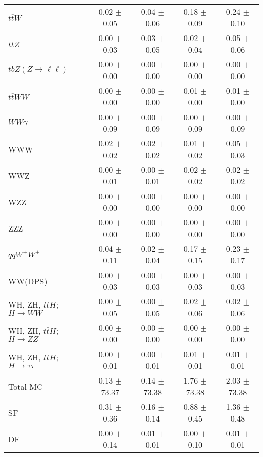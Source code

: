 \begin{tabular}{l|cccc}
                   $t\overline{t}W$ &  0.02 $\pm$  0.05 &  0.04 $\pm$  0.06 &  0.18 $\pm$  0.09 &  0.24 $\pm$  0.10 \\
                   $t\overline{t}Z$ &  0.00 $\pm$  0.03 &  0.03 $\pm$  0.05 &  0.02 $\pm$  0.04 &  0.05 $\pm$  0.06 \\
    $tbZ (Z \rightarrow \ell \ell)$ &  0.00 $\pm$  0.00 &  0.00 $\pm$  0.00 &  0.00 $\pm$  0.00 &  0.00 $\pm$  0.00 \\
                  $t\overline{t}WW$ &  0.00 $\pm$  0.00 &  0.00 $\pm$  0.00 &  0.01 $\pm$  0.00 &  0.01 $\pm$  0.00 \\
                         $WW\gamma$ &  0.00 $\pm$  0.09 &  0.00 $\pm$  0.09 &  0.00 $\pm$  0.09 &  0.00 $\pm$  0.09 \\
                                WWW &  0.02 $\pm$  0.02 &  0.02 $\pm$  0.02 &  0.01 $\pm$  0.02 &  0.05 $\pm$  0.03 \\
                                WWZ &  0.00 $\pm$  0.01 &  0.00 $\pm$  0.01 &  0.02 $\pm$  0.02 &  0.02 $\pm$  0.02 \\
                                WZZ &  0.00 $\pm$  0.00 &  0.00 $\pm$  0.00 &  0.00 $\pm$  0.00 &  0.00 $\pm$  0.00 \\
                                ZZZ &  0.00 $\pm$  0.00 &  0.00 $\pm$  0.00 &  0.00 $\pm$  0.00 &  0.00 $\pm$  0.00 \\
                 $qqW^{\pm}W^{\pm}$ &  0.04 $\pm$  0.11 &  0.02 $\pm$  0.04 &  0.17 $\pm$  0.15 &  0.23 $\pm$  0.17 \\
                            WW(DPS) &  0.00 $\pm$  0.03 &  0.00 $\pm$  0.03 &  0.00 $\pm$  0.03 &  0.00 $\pm$  0.03 \\
WH, ZH, $t\bar{t}H$; $H \rightarrow WW$ &  0.00 $\pm$  0.05 &  0.00 $\pm$  0.05 &  0.02 $\pm$  0.06 &  0.02 $\pm$  0.06 \\
WH, ZH, $t\bar{t}H$; $H \rightarrow ZZ$ &  0.00 $\pm$  0.00 &  0.00 $\pm$  0.00 &  0.00 $\pm$  0.00 &  0.00 $\pm$  0.00 \\
WH, ZH, $t\bar{t}H$; $H \rightarrow \tau\tau$ &  0.00 $\pm$  0.01 &  0.00 $\pm$  0.01 &  0.01 $\pm$  0.01 &  0.01 $\pm$  0.01 \\
\hline\hline
                           Total MC &  0.13 $\pm$ 73.37 &  0.14 $\pm$ 73.38 &  1.76 $\pm$ 73.38 &  2.03 $\pm$ 73.38 \\
\hline
                                 SF &  0.31 $\pm$  0.36 &  0.16 $\pm$  0.14 &  0.88 $\pm$  0.45 &  1.36 $\pm$  0.48 \\
                                 DF &  0.00 $\pm$  0.14 &  0.01 $\pm$  0.01 &  0.00 $\pm$  0.10 &  0.01 $\pm$  0.01 \\

\end{tabular}
